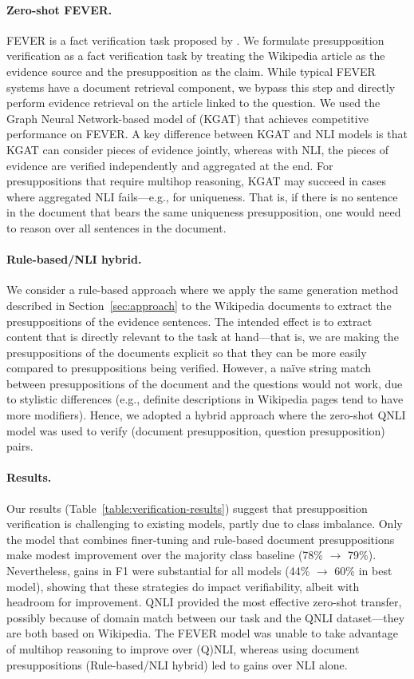 \documentclass[11pt,a4paper]{article}
\begin{document}
\paragraph{Zero-shot FEVER.} FEVER is a fact verification task proposed by \citet{thorne-etal-2018-fever}. We formulate presupposition verification as a fact verification task by treating the Wikipedia article as the evidence source and the presupposition as the claim. While typical FEVER systems have a document retrieval component, we bypass this step and directly perform evidence retrieval on the article linked to the question. We used the Graph Neural Network-based model of \citet{liu-etal-2020-fine} (KGAT) that achieves competitive performance on FEVER. A key difference between KGAT and NLI models is that KGAT can consider pieces of evidence jointly, whereas with NLI, the pieces of evidence are verified independently and aggregated at the end. For presuppositions that require multihop reasoning, KGAT may succeed in cases where aggregated NLI fails---e.g., for uniqueness. That is, if there is no sentence in the document that bears the same uniqueness presupposition, one would need to reason over all sentences in the document.

\paragraph{Rule-based/NLI hybrid.} We consider a rule-based approach where we apply the same generation method described in Section~\ref{sec:approach} to the Wikipedia documents to extract the presuppositions of the evidence sentences. The intended effect is to extract content that is directly relevant to the task at hand---that is, we are making the presuppositions of the documents explicit so that they can be more easily compared to presuppositions being verified. However, a na{\"i}ve string match between presuppositions of the document and the questions would not work, due to stylistic differences (e.g., definite descriptions in Wikipedia pages tend to have more modifiers). Hence, we adopted a hybrid approach where the zero-shot QNLI model was used to verify (document presupposition, question presupposition) pairs. 

\paragraph{Results.} Our results (Table~\ref{table:verification-results}) suggest that presupposition verification is challenging to existing models, partly due to class imbalance. Only the model that combines finer-tuning and rule-based document presuppositions make modest improvement over the majority class baseline (78\% $\rightarrow$ 79\%). Nevertheless, gains in F1 were substantial for all models (44\% $\rightarrow$ 60\% in best model), showing that these strategies do impact verifiability, albeit with headroom for improvement. QNLI provided the most effective zero-shot transfer, possibly because of domain match between our task and the QNLI dataset---they are both based on Wikipedia. The FEVER model was unable to take advantage of multihop reasoning to improve over (Q)NLI, whereas using document presuppositions (Rule-based/NLI hybrid) led to gains over NLI alone. 
\end{document}
